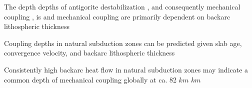 \documentclass[draft,linenumbers]{agujournal2018} %
\providecommand{\DIFaddtex}[1]{{\protect\color{blue} \sf #1}} %
\providecommand{\DIFdeltex}[1]{{\protect\color{red} \scriptsize #1}} %
\providecommand{\DIFaddbegin}{} %
\providecommand{\DIFaddend}{} %
\providecommand{\DIFdelbegin}{} %
\providecommand{\DIFdelend}{} %
\providecommand{\DIFadd}[1]{\texorpdfstring{\DIFaddtex{#1}}{#1}} %
\providecommand{\DIFdel}[1]{\texorpdfstring{\DIFdeltex{#1}}{}} %
\newcommand{\DIFscaledelfig}{0.3}
\newlength{\DIFdelgraphicswidth} %
\newlength{\DIFdelgraphicsheight} %
\newcommand{\DIFaddincludegraphics}[2][]{{\color{blue}\fbox{\DIFOincludegraphics[#1]{#2}}}} %
\newcommand{\DIFdelincludegraphics}[2][]{%
\sbox{\DIFdelgraphicsbox}{\DIFOincludegraphics[#1]{#2}}%
\settoboxwidth{\DIFdelgraphicswidth}{\DIFdelgraphicsbox} %
\settoboxtotalheight{\DIFdelgraphicsheight}{\DIFdelgraphicsbox} %
\scalebox{\DIFscaledelfig}{%
\parbox[b]{\DIFdelgraphicswidth}{\usebox{\DIFdelgraphicsbox}\\[-\baselineskip] \rule{\DIFdelgraphicswidth}{0em}}\llap{\resizebox{\DIFdelgraphicswidth}{\DIFdelgraphicsheight}{%
\setlength{\unitlength}{\DIFdelgraphicswidth}%
\begin{picture}(1,1)%
\thicklines\linethickness{2pt} %
{\color[rgb]{1,0,0}\put(0,0){\framebox(1,1){}}}%
{\color[rgb]{1,0,0}\put(0,0){\line( 1,1){1}}}%
{\color[rgb]{1,0,0}\put(0,1){\line(1,-1){1}}}%
\end{picture}%
}\hspace*{3pt}}} %
} %
\DeclareRobustCommand{\DIFaddbegin}{\DIFOaddbegin \let\includegraphics\DIFaddincludegraphics} %
\DeclareRobustCommand{\DIFaddend}{\DIFOaddend \let\includegraphics\DIFOincludegraphics} %
\DeclareRobustCommand{\DIFdelbegin}{\DIFOdelbegin \let\includegraphics\DIFdelincludegraphics} %
\DeclareRobustCommand{\DIFdelend}{\DIFOaddend \let\includegraphics\DIFOincludegraphics} %
\begin{document}


\DIFaddend {}

\DIFaddbegin



\DIFaddend \begin{keypoints}
\item The \DIFdelbegin \DIFdel{depth }\DIFdelend \DIFaddbegin \DIFadd{depths }\DIFaddend of antigorite destabilization \DIFdelbegin \DIFdel{, and consequently mechanical coupling
, is }\DIFdelend \DIFaddbegin \DIFadd{and mechanical coupling
are }\DIFaddend primarily dependent on backarc lithospheric thickness
\item Coupling depths in natural subduction zones can be predicted given
slab age, convergence velocity, and backarc lithospheric thickness
\item Consistently high backarc heat flow in natural subduction zones
may indicate a common depth of mechanical coupling globally at ca. 82
\DIFdelbegin \DIFdel{$km$
}\DIFdelend \DIFaddbegin \DIFadd{\(km\)
}\DIFaddend \end{keypoints}

\DIFaddbegin
\end{document}
